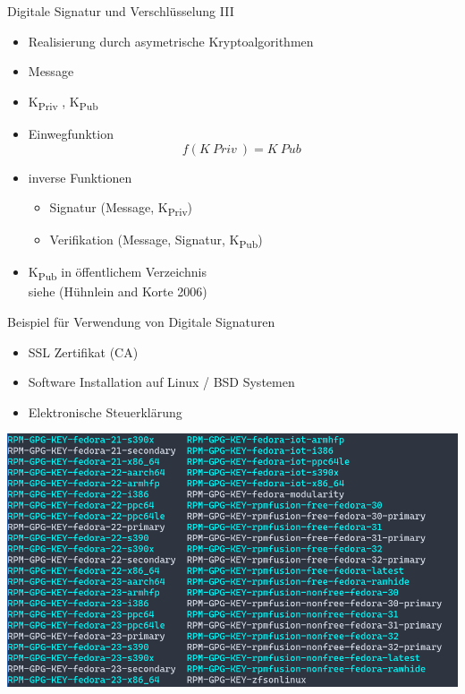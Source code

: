 \begin{frame}{Digitale Signatur und Verschlüsselung III}
\protect\hypertarget{digitale-signatur-und-verschluxfcsselung-iii}{}
\begin{itemize}
\item
  Realisierung durch asymetrische Kryptoalgorithmen
\item
  Message
\item
  K\textsubscript{Priv} , K\textsubscript{Pub}
\item
  Einwegfunktion \[f(K~Priv~) = K~Pub~\]
\item
  inverse Funktionen

  \begin{itemize}
  \tightlist
  \item
    Signatur (Message, K\textsubscript{Priv})
  \item
    Verifikation (Message, Signatur, K\textsubscript{Pub})
  \end{itemize}
\item
  K\textsubscript{Pub} in öffentlichem Verzeichnis\\
  siehe (Hühnlein and Korte 2006)
\end{itemize}
\end{frame}

\begin{frame}{Beispiel für Verwendung von Digitale Signaturen}
\protect\hypertarget{beispiel-fuxfcr-verwendung-von-digitale-signaturen}{}
\begin{itemize}
\tightlist
\item
  SSL Zertifikat (CA)
\item
  Software Installation auf Linux / BSD Systemen
\item
  Elektronische Steuerklärung
\end{itemize}

\includegraphics[width=\textwidth,height=0.6\textheight]{Abbildungen/GPG.png}
\end{frame}

